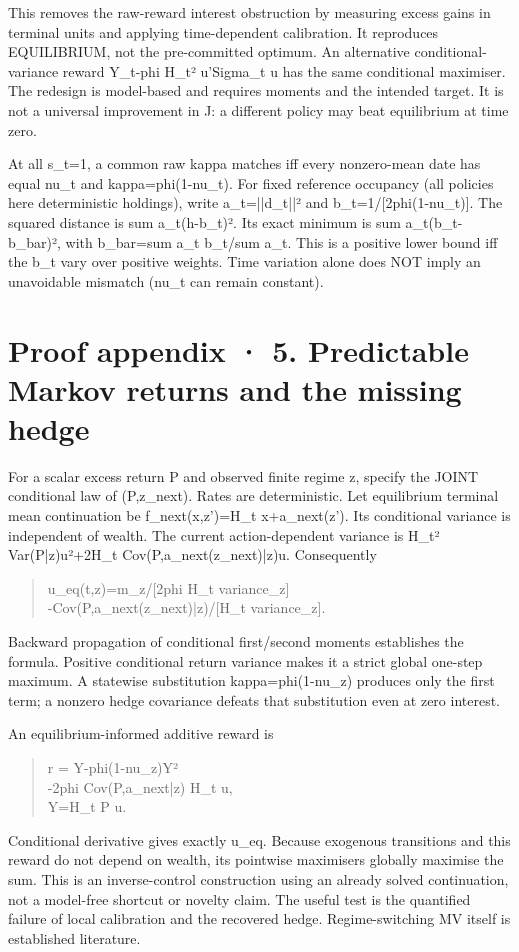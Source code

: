 \documentclass[10pt,a4paper]{article}
\begin{document}
This removes the raw-reward interest obstruction by measuring excess gains in terminal units and applying time-dependent calibration. It reproduces EQUILIBRIUM, not the pre-committed optimum. An alternative conditional-variance reward Y\_t-phi H\_t² u'Sigma\_t u has the same conditional maximiser. The redesign is model-based and requires moments and the intended target. It is not a universal improvement in J: a different policy may beat equilibrium at time zero.

At all s\_t=1, a common raw kappa matches iff every nonzero-mean date has equal nu\_t and kappa=phi(1-nu\_t). For fixed reference occupancy (all policies here deterministic holdings), write a\_t=||d\_t||² and b\_t=1/[2phi(1-nu\_t)]. The squared distance is sum a\_t(h-b\_t)². Its exact minimum is sum a\_t(b\_t-b\_bar)², with b\_bar=sum a\_t b\_t/sum a\_t. This is a positive lower bound iff the b\_t vary over positive weights. Time variation alone does NOT imply an unavoidable mismatch (nu\_t can remain constant).

\clearpage
\section*{Proof appendix · 5. Predictable Markov returns and the missing hedge}
For a scalar excess return P and observed finite regime z, specify the JOINT conditional law of (P,z\_next). Rates are deterministic. Let equilibrium terminal mean continuation be f\_next(x,z')=H\_t x+a\_next(z'). Its conditional variance is independent of wealth. The current action-dependent variance is H\_t² Var(P|z)u²+2H\_t Cov(P,a\_next(z\_next)|z)u. Consequently

\begin{quote}\small
u\_eq(t,z)=m\_z/[2phi H\_t variance\_z]\\
          -Cov(P,a\_next(z\_next)|z)/[H\_t variance\_z].
\end{quote}
Backward propagation of conditional first/second moments establishes the formula. Positive conditional return variance makes it a strict global one-step maximum. A statewise substitution kappa=phi(1-nu\_z) produces only the first term; a nonzero hedge covariance defeats that substitution even at zero interest.

An equilibrium-informed additive reward is

\begin{quote}\small
r = Y-phi(1-nu\_z)Y²\\
    -2phi Cov(P,a\_next|z) H\_t u,\\
Y=H\_t P u.
\end{quote}
Conditional derivative gives exactly u\_eq. Because exogenous transitions and this reward do not depend on wealth, its pointwise maximisers globally maximise the sum. This is an inverse-control construction using an already solved continuation, not a model-free shortcut or novelty claim. The useful test is the quantified failure of local calibration and the recovered hedge. Regime-switching MV itself is established literature.
\end{document}
